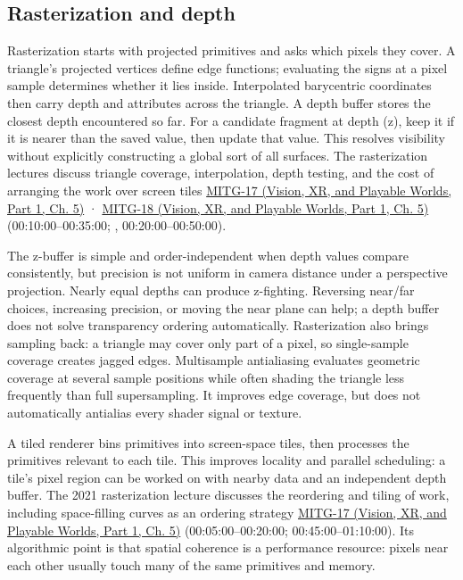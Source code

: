 \subsection{Rasterization and depth}\label{03-visual-computing-i-ch015-rasterization-and-depth}

\hypertarget{03-visual-computing-i-ch015-rasterization-and-depth}{}

Rasterization starts with projected primitives and asks which pixels they cover. A triangle's projected vertices define edge functions; evaluating the signs at a pixel sample determines whether it lies inside. Interpolated barycentric coordinates then carry depth and attributes across the triangle. A depth buffer stores the closest depth encountered so far. For a candidate fragment at depth (z), keep it if it is nearer than the saved value, then update that value. This resolves visibility without explicitly constructing a global sort of all surfaces. The rasterization lectures discuss triangle coverage, interpolation, depth testing, and the cost of arranging the work over screen tiles \href{../07-Vision-XR-and-Playable-Worlds-P01/main.pdf\#nameddest=04-visual-computing-ii-ch036-mitg-17---rasterization}{MITG-17 (Vision, XR, and Playable Worlds, Part 1, Ch. 5)} · \href{../07-Vision-XR-and-Playable-Worlds-P01/main.pdf\#nameddest=04-visual-computing-ii-ch036-mitg-18---rasterization-ii}{MITG-18 (Vision, XR, and Playable Worlds, Part 1, Ch. 5)} (00:10:00--00:35:00; , 00:20:00--00:50:00).

The z-buffer is simple and order-independent when depth values compare consistently, but precision is not uniform in camera distance under a perspective projection. Nearly equal depths can produce z-fighting. Reversing near/far choices, increasing precision, or moving the near plane can help; a depth buffer does not solve transparency ordering automatically. Rasterization also brings sampling back: a triangle may cover only part of a pixel, so single-sample coverage creates jagged edges. Multisample antialiasing evaluates geometric coverage at several sample positions while often shading the triangle less frequently than full supersampling. It improves edge coverage, but does not automatically antialias every shader signal or texture.

A tiled renderer bins primitives into screen-space tiles, then processes the primitives relevant to each tile. This improves locality and parallel scheduling: a tile's pixel region can be worked on with nearby data and an independent depth buffer. The 2021 rasterization lecture discusses the reordering and tiling of work, including space-filling curves as an ordering strategy \href{../07-Vision-XR-and-Playable-Worlds-P01/main.pdf\#nameddest=04-visual-computing-ii-ch036-mitg-17---rasterization}{MITG-17 (Vision, XR, and Playable Worlds, Part 1, Ch. 5)} (00:05:00--00:20:00; 00:45:00--01:10:00). Its algorithmic point is that spatial coherence is a performance resource: pixels near each other usually touch many of the same primitives and memory.


